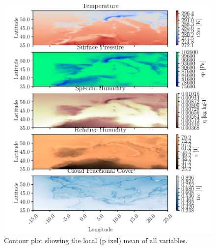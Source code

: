 \begin{figure}[ht]
    \centering
    \includegraphics{python_figs/contourplot_all_variables_mean.pdf}
    \caption{Contour plot showing the local (p ixel) mean of all variables.}
    \label{fig:contour_mean_all_vars}
\end{figure}


